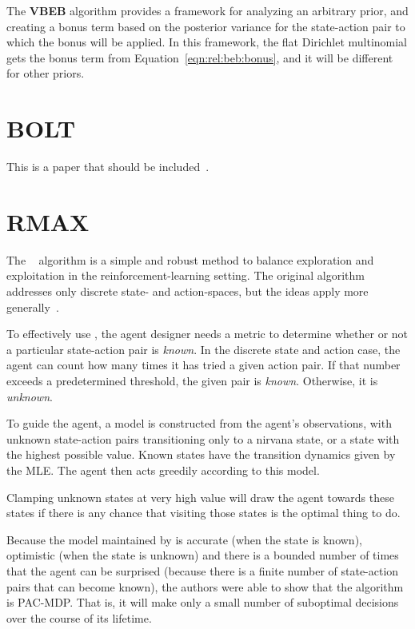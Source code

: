 The {\bf VBEB} algorithm provides a framework for analyzing an arbitrary prior, and creating a bonus term based on the posterior variance for the state-action pair to which the bonus will be applied. In this framework, the flat Dirichlet multinomial gets the bonus term from Equation~\ref{eqn:rel:beb:bonus}, and it will be different for other priors.



\section{BOLT}

This is a paper that should be included~\cite{araya2012near}. 


\section{RMAX}

The ~\cite{brafman03} algorithm is a simple and robust method to balance exploration and exploitation in the reinforcement-learning setting. The original algorithm addresses only discrete state- and action-spaces, but the ideas apply more generally~\cite{nouri09,jong07}.

To effectively use , the agent designer needs a metric to determine whether or not a particular state-action pair is \emph{known}. In the discrete state and action case, the agent can count how many times it has tried a given action pair. If that number exceeds a predetermined threshold, the given pair is \emph{known}. Otherwise, it is \emph{unknown}.

To guide the  agent, a model is constructed from the agent's observations, with unknown state-action pairs transitioning only to a nirvana state, or a state with the highest possible value. Known states have the transition dynamics given by the MLE. The agent then acts greedily according to this model.

Clamping unknown states at very high value will draw the agent towards these states if there is any chance that visiting those states is the optimal thing to do.

Because the model maintained by  is accurate (when the state is known), optimistic (when the state is unknown) and there is a bounded number of times that the agent can be surprised (because there is a finite number of state-action pairs that can become known), the authors were able to show that the algorithm is PAC-MDP. That is, it will make only a small number of suboptimal decisions over the course of its lifetime.

